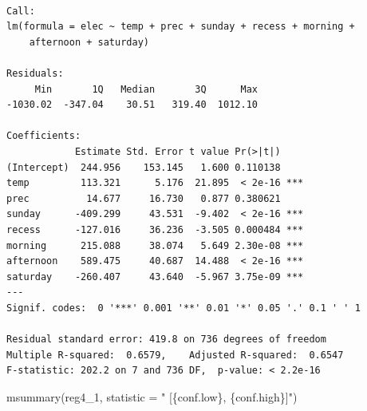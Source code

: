 \documentclass[
  letterpaper,
  DIV=11,
  numbers=noendperiod]{scrreprt}
\newenvironment{Shaded}{\begin{snugshade}}{\end{snugshade}}
\newcommand{\AttributeTok}[1]{\textcolor[rgb]{0.40,0.45,0.13}{#1}}
\newcommand{\FunctionTok}[1]{\textcolor[rgb]{0.28,0.35,0.67}{#1}}
\newcommand{\NormalTok}[1]{\textcolor[rgb]{0.00,0.23,0.31}{#1}}
\newcommand{\StringTok}[1]{\textcolor[rgb]{0.13,0.47,0.30}{#1}}
\begin{document}
\begin{verbatim}

Call:
lm(formula = elec ~ temp + prec + sunday + recess + morning + 
    afternoon + saturday)

Residuals:
     Min       1Q   Median       3Q      Max 
-1030.02  -347.04    30.51   319.40  1012.10 

Coefficients:
            Estimate Std. Error t value Pr(>|t|)    
(Intercept)  244.956    153.145   1.600 0.110138    
temp         113.321      5.176  21.895  < 2e-16 ***
prec          14.677     16.730   0.877 0.380621    
sunday      -409.299     43.531  -9.402  < 2e-16 ***
recess      -127.016     36.236  -3.505 0.000484 ***
morning      215.088     38.074   5.649 2.30e-08 ***
afternoon    589.475     40.687  14.488  < 2e-16 ***
saturday    -260.407     43.640  -5.967 3.75e-09 ***
---
Signif. codes:  0 '***' 0.001 '**' 0.01 '*' 0.05 '.' 0.1 ' ' 1

Residual standard error: 419.8 on 736 degrees of freedom
Multiple R-squared:  0.6579,    Adjusted R-squared:  0.6547 
F-statistic: 202.2 on 7 and 736 DF,  p-value: < 2.2e-16
\end{verbatim}

\begin{Shaded}
\begin{Highlighting}[]
\FunctionTok{msummary}\NormalTok{(reg4\_1,}
         \AttributeTok{statistic =} \StringTok{" [\{conf.low\}, \{conf.high\}]"}\NormalTok{)}
\end{Highlighting}
\end{Shaded}
\end{document}
